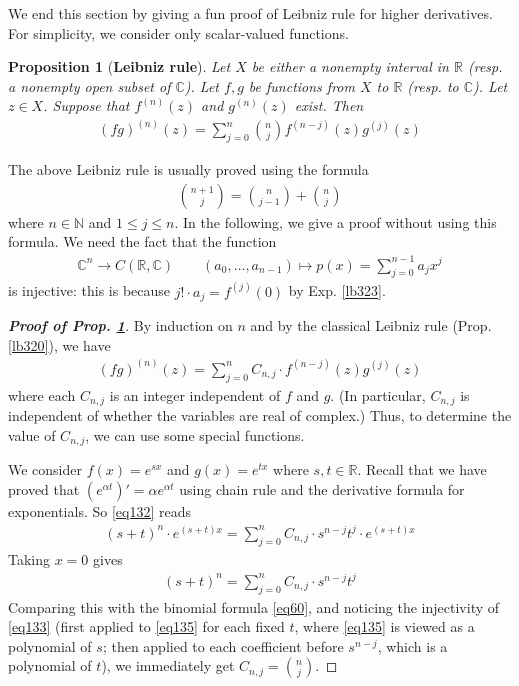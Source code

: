 \documentclass[12pt,b5paper,notitlepage]{article}
\theoremstyle{definition}
\theoremstyle{plain}
\newtheorem{pp}[df]{Proposition}
\newcommand{\Cbb}{\mathbb C}
\newcommand{\Nbb}{\mathbb N}
\newcommand{\Rbb}{\mathbb R}
\numberwithin{equation}{section}
\begin{document}
We end this section by giving a fun proof of Leibniz rule for higher derivatives. For simplicity, we consider only scalar-valued functions.



\begin{pp}[\textbf{Leibniz rule}]   \label{lb348}
Let $X$ be either a nonempty interval in $\Rbb$ (resp. a nonempty open subset of $\Cbb$). Let $f,g$ be functions from $X$ to $\Rbb$ (resp. to $\Cbb$). Let $z\in X$. Suppose that $f^{(n)}(z)$ and $g^{(n)}(z)$ exist. Then
\begin{align}
(fg)^{(n)}(z)=\sum_{j=0}^n {n\choose j}f^{(n-j)}(z)g^{(j)}(z)
\end{align}
\end{pp}




The above Leibniz rule is usually proved using the formula
\begin{align}
{n+1\choose j}={n\choose j-1}+{n\choose j}
\end{align}
where $n\in\Nbb$ and $1\leq j\leq n$. In the following, we give a proof without using this formula. We need the fact that the function
\begin{align}
\Cbb^n\rightarrow C(\Rbb,\Cbb)\qquad  (a_0,\dots,a_{n-1})\mapsto p(x)=\sum_{j=0}^{n-1}a_jx^j  \label{eq133}
\end{align}
is injective: this is because $j!\cdot a_j=f^{(j)}(0)$ by Exp. \ref{lb323}.



\begin{proof}[\textbf{Proof of Prop. \ref{lb348}}]
By induction on $n$ and by the classical Leibniz rule (Prop. \ref{lb320}), we have
\begin{align}
(fg)^{(n)}(z)=\sum_{j=0}^n C_{n,j}\cdot f^{(n-j)}(z)g^{(j)}(z) \label{eq132}
\end{align}
where each $C_{n,j}$ is an integer independent of $f$ and $g$. (In particular, $C_{n,j}$ is independent of whether the variables are real of complex.) Thus, to determine the value of $C_{n,j}$, we can use some special functions. 

We consider $f(x)=e^{s x}$ and $g(x)=e^{t x}$ where $s,t\in\Rbb$. Recall that we have proved that $(e^{\alpha t})'=\alpha e^{\alpha t}$ using chain rule and the derivative formula for exponentials. So \eqref{eq132} reads
\begin{align*}
(s+t)^n\cdot e^{(s+t)x}=\sum_{j=0}^n C_{n,j}\cdot s^{n-j}t^{j}\cdot e^{(s+t)x}
\end{align*}
Taking $x=0$ gives
\begin{align}
(s+t)^n=\sum_{j=0}^n C_{n,j}\cdot s^{n-j}t^j  \label{eq135}
\end{align}
Comparing this with the binomial formula \eqref{eq60}, and noticing the injectivity of  \eqref{eq133} (first applied to \eqref{eq135} for each fixed $t$, where \eqref{eq135} is viewed as a polynomial of $s$; then applied to each coefficient before $s^{n-j}$, which is a polynomial of $t$), we immediately get $C_{n,j}={n\choose j}$.
\end{proof}
\end{document}
